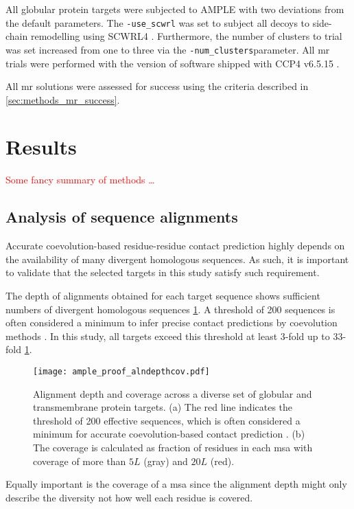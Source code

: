 All globular protein targets were subjected to AMPLE with two deviations from the default parameters. The \texttt{-use\_scwrl} was set to subject all decoys to side-chain remodelling using SCWRL4 \cite{Krivov2009-ex}. Furthermore, the number of clusters to trial was set increased from one to three via the \texttt{-num\_clusters}parameter. All \gls{mr} trials were performed with the version of software shipped with CCP4 v6.5.15 \cite{Winn2011-xe}.

All \gls{mr} solutions were assessed for success using the criteria described in \cref{sec:methods_mr_success}.

\section{Results}
\textcolor{red}{Some fancy summary of methods \ldots}

\subsection{Analysis of sequence alignments}
Accurate coevolution-based residue-residue contact prediction highly depends on the availability of many divergent homologous sequences. As such, it is important to validate that the selected targets in this study satisfy such requirement.

The depth of alignments obtained for each target sequence shows sufficient numbers of divergent homologous sequences \cref{fig:ample_proof_alndepthcov}. A threshold of 200 sequences is often considered a minimum to infer precise contact predictions by coevolution methods \cite{Simkovic2017-xs}. In this study, all targets exceed this threshold at least 3-fold up to 33-fold \cref{fig:ample_proof_alndepthcov}.

\begin{figure}[H]
    \centering
    \texttt{[image: ample\_proof\_alndepthcov.pdf]}
    \caption[Alignment depth and coverage across a diverse set of globular and transmembrane protein targets.]{Alignment depth and coverage across a diverse set of globular and transmembrane protein targets. (a) The red line indicates the threshold of 200 effective sequences, which is often considered a minimum for accurate coevolution-based contact prediction \cite{Simkovic2016-wk}. (b) The coverage is calculated as fraction of residues in each \gls{msa} with coverage of more than $5L$ (gray) and $20L$ (red).}
    \label{fig:ample_proof_alndepthcov}
\end{figure}

Equally important is the coverage of a \gls{msa} since the alignment depth might only describe the diversity not how well each residue is covered.  

